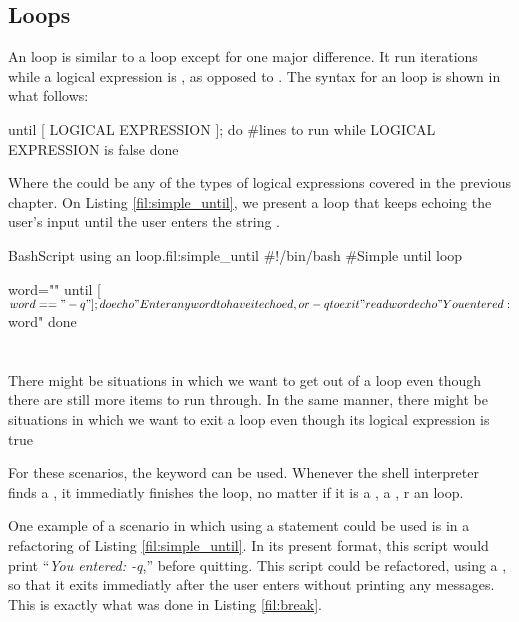 \subsection{ Loops}
An  loop is similar to a  loop except for one major difference. It run iterations while a logical expression is , as opposed to . The syntax for an  loop is shown in what follows:

\begin{command_line}[Bash]
until [ LOGICAL EXPRESSION ]; do
    #lines to run while LOGICAL EXPRESSION is false
done    
\end{command_line}
Where the  could be any of the types of logical expressions covered in the previous chapter. On Listing \ref{fil:simple_until}, we present a loop that keeps echoing the user's input until the user enters the string .

\begin{source_code_float}{Bash}{Script using an  loop.}{fil:simple_until}
#!/bin/bash
#Simple until loop

word=""
until [ $word == "-q" ] ; do
   echo "Enter any word to have it echoed, or -q to exit"
   read word
   echo "You entered: $word"
done
\end{source_code_float}

\section{}
There might be situations in which we want to get out of a  loop even though there are still more items to run through. In the same manner, there might be situations in which we want to exit a  loop even though its logical expression is true

For these scenarios, the keyword  can be used. Whenever the shell interpreter finds a , it immediatly finishes the loop, no matter if it is a , a , r an  loop. 

One example of a scenario in which using a  statement could be used is in a refactoring of Listing \ref{fil:simple_until}. In its present format, this script would print ``\textit{You entered: -q},'' before quitting. This script could be refactored, using a , so that it exits immediatly after the user enters  without printing any messages. This is exactly what was done in Listing \ref{fil:break}.

